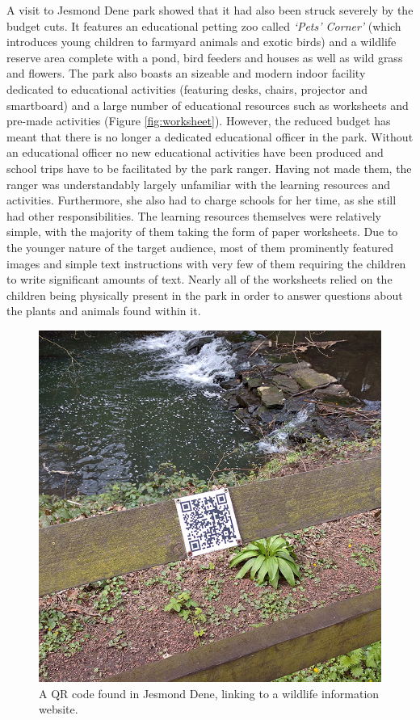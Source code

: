 A visit to Jesmond Dene park showed that it had also been struck severely by the budget cuts. It features an educational petting zoo called \textit{`Pets' Corner'} (which introduces young children to farmyard animals and exotic birds) and a wildlife reserve area complete with a pond, bird feeders and houses as well as wild grass and flowers. The park also boasts an sizeable and modern indoor facility dedicated to educational activities (featuring desks, chairs, projector and smartboard) and a large number of educational resources such as worksheets and pre-made activities (Figure \ref{fig:worksheet}). However, the reduced budget has meant that there is no longer a dedicated educational officer in the park. Without an educational officer no new educational activities have been produced and school trips have to be facilitated by the park ranger. Having not made them, the ranger was understandably largely unfamiliar with the learning resources and activities. Furthermore, she also had to charge schools for her time, as she still had other responsibilities. The learning resources themselves were relatively simple, with the majority of them taking the form of paper worksheets. Due to the younger nature of the target audience, most of them prominently featured images and simple text instructions with very few of them requiring the children to write significant amounts of text. Nearly all of the worksheets relied on the children being physically present in the park in order to answer questions about the plants and animals found within it.

\begin{figure}
  \centering
  \includegraphics[width=0.6\columnwidth]{images/chapter04/jesmondQR.jpg}
  \caption[An existing QR code]{A QR code found in Jesmond Dene, linking to a wildlife information website.}
  \label{fig:jesmondQR}
\end{figure}

